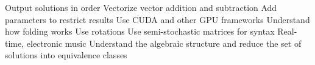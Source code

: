 Output solutions in order
Vectorize vector addition and subtraction
Add parameters to restrict results
Use CUDA and other GPU frameworks
Understand how folding works
Use rotations
Use semi-stochastic matrices for syntax
Real-time, electronic music
Understand the algebraic structure and reduce the set of solutions into equivalence classes
